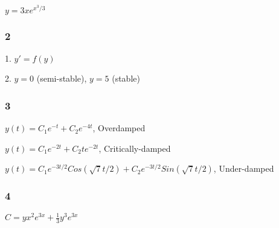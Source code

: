 $y=3xe^{x^3/3}$

\subsubsection{2}

1. $y'=f(y)$

2. $y=0$ (semi-stable), $y=5$ (stable)

\subsubsection{3}

$y(t)=C_1 e^{-t} + C_2 e^{-4t}$, Overdamped

$y(t)=C_1 e^{-2t} + C_2 t e^{-2t}$, Critically-damped

$y(t)=C_1 e^{-3t/2} Cos(\sqrt{7}t/2) + C_2 e^{-3t/2} Sin(\sqrt{7}t/2)$, Under-damped

\subsubsection{4}

$C = yx^2e^{3x} + \frac{1}{3} y^3 e^{3x}$
